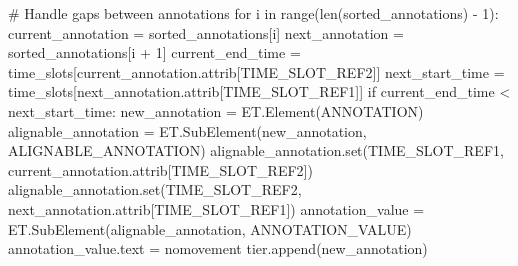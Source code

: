 \documentclass[
  letterpaper,
  DIV=11,
  numbers=noendperiod]{scrreprt}
\newenvironment{Shaded}{\begin{snugshade}}{\end{snugshade}}
\newcommand{\BuiltInTok}[1]{\textcolor[rgb]{0.00,0.23,0.31}{#1}}
\newcommand{\CommentTok}[1]{\textcolor[rgb]{0.37,0.37,0.37}{#1}}
\newcommand{\ControlFlowTok}[1]{\textcolor[rgb]{0.00,0.23,0.31}{#1}}
\newcommand{\DecValTok}[1]{\textcolor[rgb]{0.68,0.00,0.00}{#1}}
\newcommand{\KeywordTok}[1]{\textcolor[rgb]{0.00,0.23,0.31}{#1}}
\newcommand{\NormalTok}[1]{\textcolor[rgb]{0.00,0.23,0.31}{#1}}
\newcommand{\OperatorTok}[1]{\textcolor[rgb]{0.37,0.37,0.37}{#1}}
\newcommand{\StringTok}[1]{\textcolor[rgb]{0.13,0.47,0.30}{#1}}
\begin{document}
\begin{Shaded}
\begin{Highlighting}[]
            \CommentTok{\# Handle gaps between annotations}
            \ControlFlowTok{for}\NormalTok{ i }\KeywordTok{in} \BuiltInTok{range}\NormalTok{(}\BuiltInTok{len}\NormalTok{(sorted\_annotations) }\OperatorTok{{-}} \DecValTok{1}\NormalTok{):}
\NormalTok{                current\_annotation }\OperatorTok{=}\NormalTok{ sorted\_annotations[i]}
\NormalTok{                next\_annotation }\OperatorTok{=}\NormalTok{ sorted\_annotations[i }\OperatorTok{+} \DecValTok{1}\NormalTok{]}
\NormalTok{                current\_end\_time }\OperatorTok{=}\NormalTok{ time\_slots[current\_annotation.attrib[}\StringTok{\textquotesingle{}TIME\_SLOT\_REF2\textquotesingle{}}\NormalTok{]]}
\NormalTok{                next\_start\_time }\OperatorTok{=}\NormalTok{ time\_slots[next\_annotation.attrib[}\StringTok{\textquotesingle{}TIME\_SLOT\_REF1\textquotesingle{}}\NormalTok{]]}
                \ControlFlowTok{if}\NormalTok{ current\_end\_time }\OperatorTok{\textless{}}\NormalTok{ next\_start\_time:}
\NormalTok{                    new\_annotation }\OperatorTok{=}\NormalTok{ ET.Element(}\StringTok{\textquotesingle{}ANNOTATION\textquotesingle{}}\NormalTok{)}
\NormalTok{                    alignable\_annotation }\OperatorTok{=}\NormalTok{ ET.SubElement(new\_annotation, }\StringTok{\textquotesingle{}ALIGNABLE\_ANNOTATION\textquotesingle{}}\NormalTok{)}
\NormalTok{                    alignable\_annotation.}\BuiltInTok{set}\NormalTok{(}\StringTok{\textquotesingle{}TIME\_SLOT\_REF1\textquotesingle{}}\NormalTok{, current\_annotation.attrib[}\StringTok{\textquotesingle{}TIME\_SLOT\_REF2\textquotesingle{}}\NormalTok{])}
\NormalTok{                    alignable\_annotation.}\BuiltInTok{set}\NormalTok{(}\StringTok{\textquotesingle{}TIME\_SLOT\_REF2\textquotesingle{}}\NormalTok{, next\_annotation.attrib[}\StringTok{\textquotesingle{}TIME\_SLOT\_REF1\textquotesingle{}}\NormalTok{])}
\NormalTok{                    annotation\_value }\OperatorTok{=}\NormalTok{ ET.SubElement(alignable\_annotation, }\StringTok{\textquotesingle{}ANNOTATION\_VALUE\textquotesingle{}}\NormalTok{)}
\NormalTok{                    annotation\_value.text }\OperatorTok{=} \StringTok{\textquotesingle{}nomovement\textquotesingle{}}
\NormalTok{                    tier.append(new\_annotation)}


\end{Highlighting}
\end{Shaded}
\end{document}
